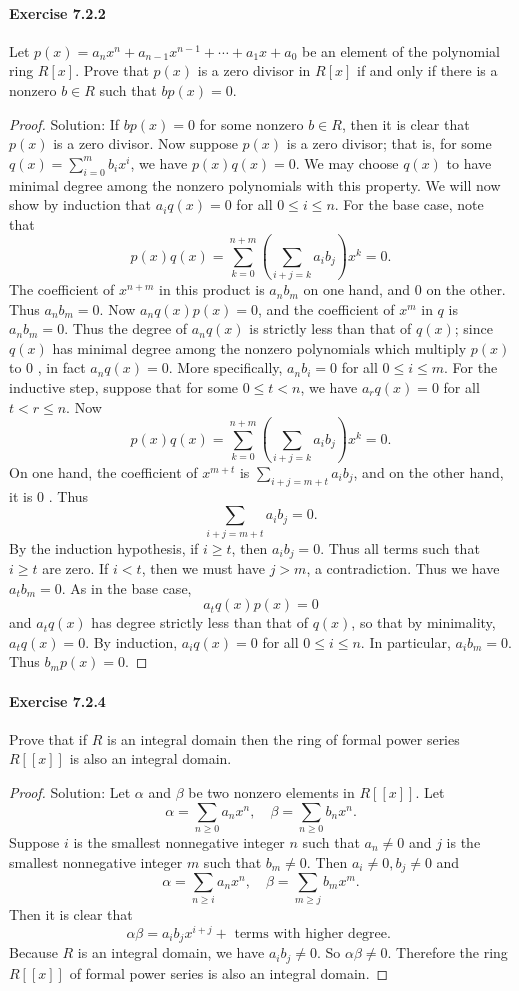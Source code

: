 \documentclass{article}
\theoremstyle{definition}
\begin{document}
\paragraph{Exercise 7.2.2} Let $p(x)=a_{n} x^{n}+a_{n-1} x^{n-1}+\cdots+a_{1} x+a_{0}$ be an element of the polynomial ring $R[x]$. Prove that $p(x)$ is a zero divisor in $R[x]$ if and only if there is a nonzero $b \in R$ such that $b p(x)=0$.
\begin{proof}
    Solution: If $b p(x)=0$ for some nonzero $b \in R$, then it is clear that $p(x)$ is a zero divisor.
Now suppose $p(x)$ is a zero divisor; that is, for some $q(x)=\sum_{i=0}^m b_i x^i$, we have $p(x) q(x)=0$. We may choose $q(x)$ to have minimal degree among the nonzero polynomials with this property.
We will now show by induction that $a_i q(x)=0$ for all $0 \leq i \leq n$.
For the base case, note that
$$
p(x) q(x)=\sum_{k=0}^{n+m}\left(\sum_{i+j=k} a_i b_j\right) x^k=0 .
$$
The coefficient of $x^{n+m}$ in this product is $a_n b_m$ on one hand, and 0 on the other. Thus $a_n b_m=0$. Now $a_n q(x) p(x)=0$, and the coefficient of $x^m$ in $q$ is $a_n b_m=0$. Thus the degree of $a_n q(x)$ is strictly less than that of $q(x)$; since $q(x)$ has minimal degree among the nonzero polynomials which multiply $p(x)$ to 0 , in fact $a_n q(x)=0$. More specifically, $a_n b_i=0$ for all $0 \leq i \leq m$.
For the inductive step, suppose that for some $0 \leq t<n$, we have $a_r q(x)=0$ for all $t<r \leq n$. Now
$$
p(x) q(x)=\sum_{k=0}^{n+m}\left(\sum_{i+j=k} a_i b_j\right) x^k=0 .
$$
On one hand, the coefficient of $x^{m+t}$ is $\sum_{i+j=m+t} a_i b_j$, and on the other hand, it is 0 . Thus
$$
\sum_{i+j=m+t} a_i b_j=0 .
$$
By the induction hypothesis, if $i \geq t$, then $a_i b_j=0$. Thus all terms such that $i \geq t$ are zero. If $i<t$, then we must have $j>m$, a contradiction. Thus we have $a_t b_m=0$. As in the base case,
$$
a_t q(x) p(x)=0
$$
and $a_t q(x)$ has degree strictly less than that of $q(x)$, so that by minimality, $a_t q(x)=0$.
By induction, $a_i q(x)=0$ for all $0 \leq i \leq n$. In particular, $a_i b_m=0$. Thus $b_m p(x)=0$.
\end{proof}


\paragraph{Exercise 7.2.4} Prove that if $R$ is an integral domain then the ring of formal power series $R[[x]]$ is also an integral domain.
\begin{proof}
    Solution: Let $\alpha$ and $\beta$ be two nonzero elements in $R[[x]]$. Let
$$
\alpha=\sum_{n \geqslant 0} a_n x^n, \quad \beta=\sum_{n \geqslant 0} b_n x^n .
$$
Suppose $i$ is the smallest nonnegative integer $n$ such that $a_n \neq 0$ and $j$ is the smallest nonnegative integer $m$ such that $b_m \neq 0$. Then $a_i \neq 0, b_j \neq 0$ and
$$
\alpha=\sum_{n \geqslant i} a_n x^n, \quad \beta=\sum_{m \geqslant j} b_m x^m .
$$
Then it is clear that
$$
\alpha \beta=a_i b_j x^{i+j}+\text { terms with higher degree. }
$$
Because $R$ is an integral domain, we have $a_i b_j \neq 0$. So $\alpha \beta \neq 0$. Therefore the ring $R[[x]]$ of formal power series is also an integral domain.
\end{proof}
\end{document}
